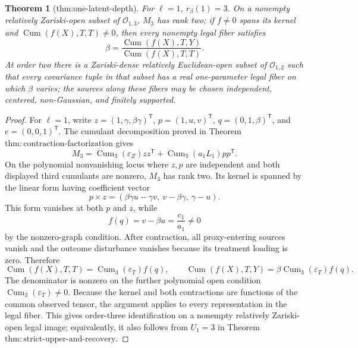 \documentclass{article}
\newtheorem{theorem}{Theorem}
\begin{document}
\begin{theorem}[thm:one-latent-depth]\label{thm:one-latent-depth}
For \(\ell=1\), \(r_\beta(1)=3\).  On a nonempty relatively Zariski-open subset of \(\mathcal O_{1,3}\), \(M_3\) has rank two; if \(f\ne0\) spans its kernel and \(\operatorname{Cum}(f(X),T,T)\ne0\), then every nonempty legal fiber satisfies
\[
 \beta=\frac{\operatorname{Cum}(f(X),T,Y)}{\operatorname{Cum}(f(X),T,T)}.
\]
At order two there is a Zariski-dense relatively Euclidean-open subset of \(\mathcal O_{1,2}\) such that every covariance tuple in that subset has a real one-parameter legal fiber on which \(\beta\) varies; the sources along these fibers may be chosen independent, centered, non-Gaussian, and finitely supported.
\end{theorem}
\begin{proof}
For \(\ell=1\), write \(z=(1,\gamma,\beta\gamma)^{\mathsf T}\), \(p=(1,u,v)^{\mathsf T}\), \(q=(0,1,\beta)^{\mathsf T}\), and \(e=(0,0,1)^{\mathsf T}\).  The cumulant decomposition proved in Theorem \(\mathrm{thm:contraction\mbox{-}factorization}\) gives
\[
 M_3=\operatorname{Cum}_3(\varepsilon_Z)zz^{\mathsf T}
     +\operatorname{Cum}_3(a_1L_1)pp^{\mathsf T}.
\]
On the polynomial nonvanishing locus where \(z,p\) are independent and both displayed third cumulants are nonzero, \(M_3\) has rank two.  Its kernel is spanned by the linear form having coefficient vector
\[
 p\times z=(\beta\gamma u-\gamma v,\ v-\beta\gamma,\ \gamma-u).
\]
This form vanishes at both \(p\) and \(z\), while
\[
 f(q)=v-\beta u=\frac{c_1}{a_1}\ne0
\]
by the nonzero-graph condition.  After contraction, all proxy-entering sources vanish and the outcome disturbance vanishes because its treatment loading is zero.  Therefore
\[
 \operatorname{Cum}(f(X),T,T)=\operatorname{Cum}_3(\varepsilon_T)f(q),
 \qquad
 \operatorname{Cum}(f(X),T,Y)=\beta\operatorname{Cum}_3(\varepsilon_T)f(q).
\]
The denominator is nonzero on the further polynomial open condition \(\operatorname{Cum}_3(\varepsilon_T)\ne0\).  Because the kernel and both contractions are functions of the common observed tensor, the argument applies to every representation in the legal fiber.  This gives order-three identification on a nonempty relatively Zariski-open legal image; equivalently, it also follows from \(U_1=3\) in Theorem \(\mathrm{thm:strict\mbox{-}upper\mbox{-}and\mbox{-}recovery}\).


\end{proof}
\end{document}

